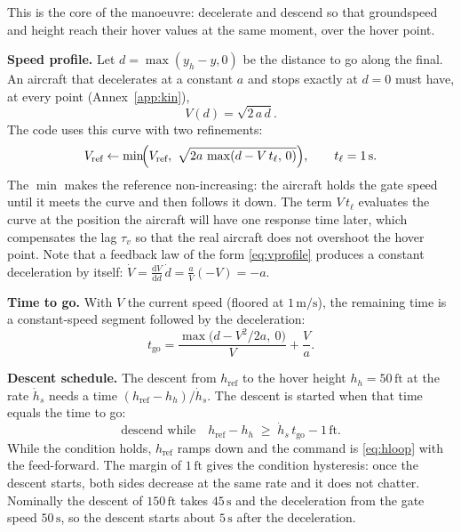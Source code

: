 \documentclass[11pt,a4paper]{article}
\newcommand{\un}[1]{\,\mathrm{#1}}
\newcommand{\dd}{\mathrm{d}}
\begin{document}
This is the core of the manoeuvre: decelerate and descend so that groundspeed
and height reach their hover values at the same moment, over the hover point.

\textbf{Speed profile.} Let $d=\max(y_h-y,0)$ be the distance to go along the
final. An aircraft that decelerates at a constant $a$ and stops exactly at
$d=0$ must have, at every point (Annex~\ref{app:kin}),
\begin{equation}
V(d) = \sqrt{2\,a\,d}. \label{eq:vprofile}
\end{equation}
The code uses this curve with two refinements:
\begin{equation}
V_{\text{ref}} \leftarrow \min\!\Bigl(V_{\text{ref}},\ \sqrt{2a\,\max(d - V\,t_\ell,\,0)}\Bigr),
\qquad t_\ell = 1\un{s}.
\end{equation}
The $\min$ makes the reference non-increasing: the aircraft holds the gate
speed until it meets the curve and then follows it down. The term $V\,t_\ell$
evaluates the curve at the position the aircraft will have one response time
later, which compensates the lag $\tau_v$ so that the real aircraft does not
overshoot the hover point. Note that a feedback law of the form
\eqref{eq:vprofile} produces a constant deceleration by itself:
$\dot V = \frac{\dd V}{\dd d}\,\dot d = \frac{a}{V}(-V) = -a$.

\textbf{Time to go.} With $V$ the current speed (floored at $1\un{m/s}$), the
remaining time is a constant-speed segment followed by the deceleration:
\begin{equation}
t_{\text{go}} = \frac{\max\bigl(d - V^2/2a,\ 0\bigr)}{V} + \frac{V}{a}.
\label{eq:tgo}
\end{equation}

\textbf{Descent schedule.} The descent from $h_{\text{ref}}$ to the hover
height $h_h=50\un{ft}$ at the rate $\dot h_s$ needs a time
$(h_{\text{ref}}-h_h)/\dot h_s$. The descent is started when that time equals
the time to go:
\begin{equation}
\text{descend while}\quad h_{\text{ref}}-h_h \;\ge\; \dot h_s\,t_{\text{go}} - 1\un{ft}.
\end{equation}
While the condition holds, $h_{\text{ref}}$ ramps down and the command is
\eqref{eq:hloop} with the feed-forward. The margin of $1\un{ft}$ gives the
condition hysteresis: once the descent starts, both sides decrease at the
same rate and it does not chatter. Nominally the descent of $150\un{ft}$ takes
$45\un{s}$ and the deceleration from the gate speed $50\un{s}$, so the descent
starts about $5\un{s}$ after the deceleration.
\end{document}

